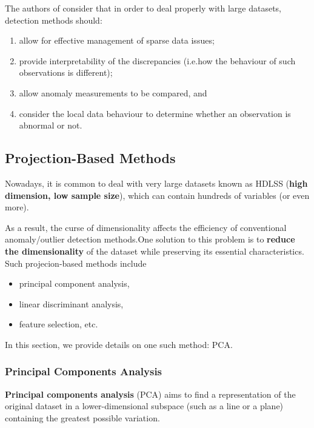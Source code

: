 \noindent The authors of \cite{AYU} consider that in order to deal properly with large datasets, detection methods should:
\begin{enumerate}[noitemsep]
\item allow for effective management of sparse data issues;
\item provide interpretability of the discrepancies (i.e.\@ how the behaviour of such observations is different);
\item allow anomaly measurements to be compared, and 
\item consider the local data behaviour to determine whether an observation is abnormal or not.
\end{enumerate}
%
\subsection{Projection-Based Methods}
Nowadays, it is common to deal with very large datasets known as HDLSS (\textbf{high dimension, low sample size}), which can contain hundreds of variables (or even more). \par As a result,  the curse of dimensionality affects the efficiency of conventional anomaly/outlier detection methods.\newl One solution to this problem is to \textbf{reduce the dimensionality} of the dataset while preserving its essential characteristics. Such projecion-based methods include \begin{itemize}[noitemsep]\item principal component analysis, \item linear discriminant analysis, \item feature selection, etc. \end{itemize} In this section, we provide details on one such method: PCA.
\subsubsection*{Principal Components Analysis}
%
\textbf{Principal components analysis} (PCA) aims to find a representation of the original dataset in a lower-dimensional subspace (such as a line or a plane)  containing the greatest possible variation. 

